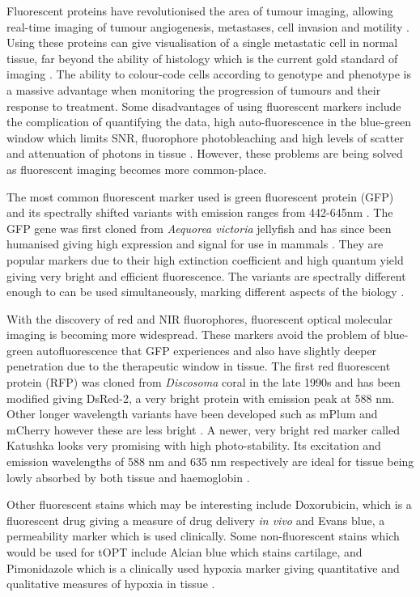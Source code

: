 	
	Fluorescent proteins have revolutionised the area of tumour imaging, allowing real-time imaging of tumour angiogenesis, metastases, cell invasion and motility \cite{Hoffman:2005}. Using these proteins can give visualisation of a single metastatic  cell in normal tissue, far beyond the ability of histology which is the current gold standard of imaging \cite{Hoffman:2009}. The ability to colour-code cells according to genotype and phenotype is a massive advantage when monitoring the progression of tumours and their response to treatment.
	Some disadvantages of using fluorescent markers include the complication of  quantifying the data, high auto-fluorescence in the blue-green window which limits SNR, fluorophore photobleaching and high levels of scatter and attenuation of photons in tissue \cite{Gross:2005}. However, these problems are being solved as fluorescent imaging becomes more common-place. 
	
	
	The most common fluorescent marker used is  green fluorescent protein (GFP) and its spectrally shifted variants with emission ranges from 442-645nm \cite{Hoffman:2005}. The GFP gene was first cloned from \textit{Aequorea victoria} jellyfish and has since been humanised giving high expression and signal for use in mammals \cite{Hoffman:2009}. They are popular markers due to their high extinction coefficient and high quantum yield giving very bright and efficient fluorescence. The variants are spectrally different enough to can be used simultaneously, marking different aspects of the biology \cite{Hoffman:2005}. 
	
	With the discovery of red and NIR fluorophores, fluorescent optical molecular imaging is becoming  more widespread. These markers avoid the problem of blue-green autofluorescence that GFP experiences and also have slightly deeper penetration due to the therapeutic window in tissue. The first red fluorescent protein (RFP) was cloned from \textit{Discosoma} coral in the late 1990s and has been modified giving DsRed-2, a very bright protein with emission peak at 588 nm. Other longer wavelength variants have been developed such as mPlum and mCherry however these are less bright \cite{Hoffman:2009}. A newer, very bright red marker called Katushka looks very promising with high photo-stability. Its excitation and emission wavelengths of 588 nm and 635 nm respectively are ideal for tissue being lowly absorbed by both tissue and haemoglobin \cite{Shcherbo:2007}.
	
	
	Other fluorescent stains which may be interesting include  Doxorubicin, which is a fluorescent drug  giving a measure of drug delivery \textit{in vivo} and Evans blue, a permeability marker which is used clinically. 
	Some non-fluorescent stains which would be used for tOPT include Alcian blue which stains cartilage, and Pimonidazole which is a clinically used hypoxia marker giving quantitative and qualitative measures of hypoxia in tissue \cite{Varia:1998}. 
	
